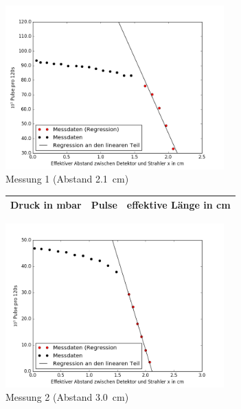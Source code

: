 \begin{figure}[h!]
	\centering
	\includegraphics[width=0.75\textwidth]{build/pulse1.png}
	\caption{Messung 1 (Abstand \SI{2,1}{\centi\meter})}
	\label{fig:pulse1}
\end{figure}

\clearpage

 \begin{figure}[h!]
 	\centering
 	\begin{tabular}{c|c|c}
 		Druck in \si{\milli\bar} & Pulse & effektive Länge in \si{cm} \\
 		\hline
 		
 	\end{tabular}
 	\label{tab:messung2}
 \end{figure}
 
 \begin{figure}[h!]
 	\centering
 	\includegraphics[width=0.75\textwidth]{build/pulse2.png}
 	\caption{Messung 2 (Abstand \SI{3,0}{\centi\meter})}
 	\label{fig:pulse2}
 \end{figure}
 
